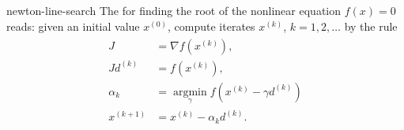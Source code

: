 \begin{Definition}{newton-line-search}
  The  for
  finding the root of the nonlinear equation $f(x) = 0$ reads: given
  an initial value $x^{(0)}$, compute iterates $x^{(k)}$,
  $k=1,2,\ldots$ by the rule
  \begin{gather}
    \label{eq:newton-line-search:1}
    \begin{split}
      J &= \nabla f\left(x^{(k)}\right),
      \\
       J d^{(k)} &= f(x^{(k)}),
      \\
      \alpha_k &= \operatorname*{argmin}_{\gamma} f(x^{(k)} - \gamma d^{(k)})\\
      x^{(k+1)} &= x^{(k)} - \alpha_k d^{(k)}.
    \end{split}
  \end{gather}
\end{Definition}

